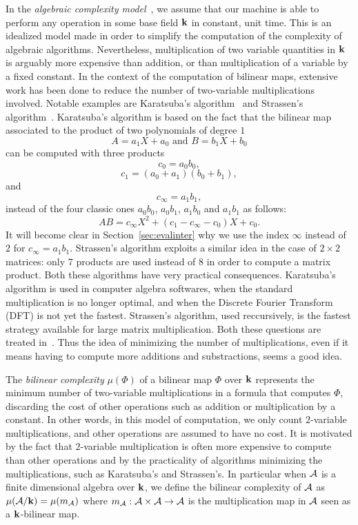In the \emph{algebraic complexity model}~\cite{BCS13}, we assume that our
machine is able to perform any operation in some base field $\mathbf{k}$ in constant,
unit time. This is an idealized model made in order to simplify the
computation of the complexity of algebraic algorithms. Nevertheless,
multiplication of two variable quantities in $\mathbf{k}$ is arguably more expensive
than addition, or than multiplication of a variable by a fixed constant. In the
context of the computation of bilinear maps, extensive work has been done to
reduce the number of two-variable multiplications involved. Notable examples are
Karatsuba's algorithm~\cite{Karatsuba63} and
Strassen's algorithm~\cite{Strassen69}. Karatsuba's algorithm is
based on the fact that the bilinear map associated to the product of two
polynomials of degree $1$
\[
  A = a_1 X + a_0\text{ and }B = b_1 X + b_0
\]
can be computed with three products
\[
  c_0 = a_0b_0,
\]
\[
  c_1 = (a_0+a_1)(b_0+b_1),
\]
and
\[
  c_\infty = a_1b_1,
\]
instead
of the four classic ones $a_0b_0$, $a_0b_1$, $a_1b_0$ and $a_1b_1$ as follows:
\[
  AB = c_\infty X^2 + (c_1-c_\infty-c_0) X + c_0.
\]
It will become clear in Section~\ref{sec:evalinter} why we use the index
$\infty$ instead of $2$ for $c_\infty = a_1b_1$. Strassen's algorithm
exploits a similar idea in the case of $2\times2$ matrices: only $7$ products
are used instead of $8$ in order to compute a matrix product. Both these
algorithms have very practical consequences. Karatsuba's algorithm is used in
computer algebra softwares, when the standard multiplication is no longer
optimal, and when the Discrete Fourier Transform (DFT) is not yet the fastest.
Strassen's algorithm, used reccursively, is the fastest strategy available for
large matrix multiplication. Both these questions are treated in~\cite{GG13}.
Thus the idea of minimizing the number of multiplications, even if it means
having to compute more additions and substractions, seems a good idea.

The \emph{bilinear complexity}
$\mu(\Phi)$ of a bilinear map $\Phi$ over $\mathbf{k}$ represents the minimum number of two-variable
multiplications in a formula that computes $\Phi$, discarding the cost of other
operations such as addition or multiplication by a constant. In other words, in
this model of computation, we only count $2$-variable multiplications, and other
operations are assumed to have no cost. It is motivated by the fact that
$2$-variable multiplication is often more expensive to compute than other
operations and by the practicality of algorithms minimizing the multiplications,
such as Karatsuba's and Strassen's.
In particular when $\mathcal{A}$ is a finite dimensional algebra over $\mathbf{k}$,
we define the bilinear complexity of $\mathcal{A}$ as $\mu(\mathcal{A}/\mathbf{k})=\mu(m_{\mathcal{A}})$
where $m_{\mathcal{A}}:\mathcal{A}\times\mathcal{A}\to\mathcal{A}$ is the multiplication map in $\mathcal{A}$ seen
as a $\mathbf{k}$-bilinear map.

